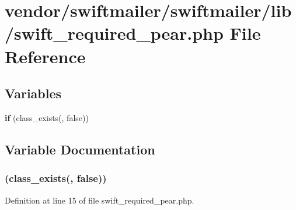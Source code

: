 \section{vendor/swiftmailer/swiftmailer/lib/swift\+\_\+required\+\_\+pear.php File Reference}
\label{swift__required__pear_8php}
\subsection*{Variables}
\begin{DoxyCompactItemize}
\item 
{\bf if} (class\+\_\+exists(\textquotesingle{}, false))
\end{DoxyCompactItemize}


\subsection{Variable Documentation}
\subsubsection[{if}]{(class\+\_\+exists(\textquotesingle{}, false))}\label{swift__required__pear_8php_a9bbddb0c78d1af5ebb173ab7194d6df6}


Definition at line 15 of file swift\+\_\+required\+\_\+pear.\+php.

